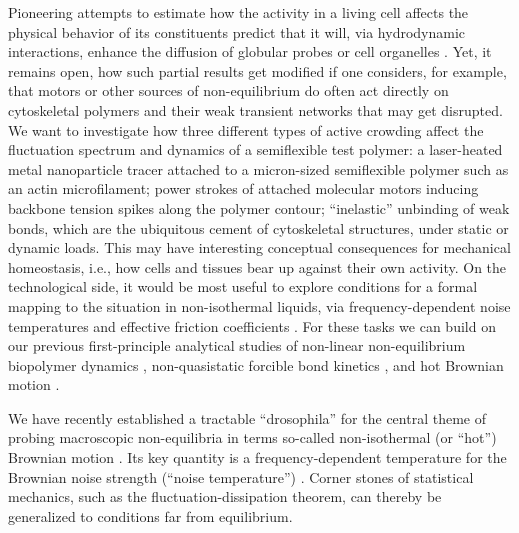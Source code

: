 \begin{workpackage}[id=WPactive,wphases=0-48,
  short=Active Particle Suspensions,%
  title=Probing active particle suspensions with colloids and polymers,
  lead=ULEI,
  ULEIRM=96,UNIPDRM=6,USTUTTRM=2]
\begin{tasklist}
\begin{task}[title=Active Crowding,id=task2,lead=ULEI,partners={KUL},wphases=0-48!0.5]
Pioneering attempts to estimate how the activity in a living cell affects the physical behavior
of its constituents predict that it will, via hydrodynamic interactions, enhance the diffusion of
globular probes or cell organelles \cite{mikhailov-kapral:2015}.
%
Yet, it remains open, how such partial results get modified if one considers, for example, that motors or
other sources of non-equilibrium do often act directly on cytoskeletal polymers and their
weak transient networks that may get disrupted.
%
We want to  investigate how three different types of active
crowding affect the fluctuation spectrum and dynamics of a semiflexible test polymer: a
laser-heated metal nanoparticle tracer attached to a micron-sized semiflexible polymer such
as an actin microfilament; power strokes of attached molecular
motors inducing backbone tension spikes along the polymer contour; ``inelastic'' \cite{gralka-kroy:2015}
unbinding of weak bonds, which are the ubiquitous cement of
cytoskeletal structures, under static or dynamic loads.
%
This may have interesting conceptual consequences for mechanical homeostasis, i.e., how cells and tissues bear up against 
their own activity.   
%
On the technological side, it would be most useful to explore conditions for a formal mapping to the situation in 
non-isothermal liquids, via frequency-dependent noise temperatures and 
effective friction coefficients \cite{falasco-etal:2014}.
%
For these tasks we can build on our previous first-principle analytical studies
of non-linear non-equilibrium biopolymer dynamics \cite{otto-etal:2013}, non-quasistatic forcible 
bond kinetics \cite{bullerjahn-sturm-kroy:2014}, and hot Brownian motion 
\cite{rings-etal:2010,falasco-etal:2014}.

\end{task}


\begin{task}[title=Noise Temperature,id=task3,lead=ULEI,wphases=0-24!0.5]
We have recently established a tractable ``drosophila'' for the central theme of probing 
macroscopic non-equilibria in terms so-called non-isothermal (or ``hot'') Brownian motion \cite{rings-etal:2010}.
%
Its key quantity is a frequency-dependent temperature for the Brownian noise 
strength (``noise temperature'') \cite{falasco-etal:2014}.
%
Corner stones of statistical mechanics, such as the fluctuation-dissipation theorem, can
thereby be generalized to conditions far from equilibrium.  


\end{task}
\end{tasklist}
\end{workpackage}
